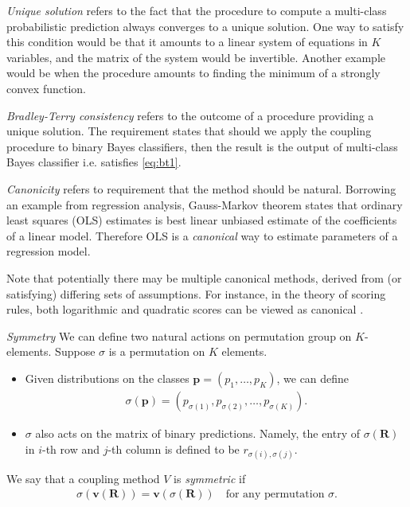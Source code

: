 \emph{Unique solution} refers to the fact that the procedure to compute a multi-class probabilistic prediction always converges to a unique solution. One way to satisfy this condition would be that it amounts to a linear system of equations in $K$ variables, and the matrix of the system would be invertible. Another example would be when the procedure amounts to finding the minimum of a strongly convex function. 

\emph{Bradley-Terry consistency} refers to the outcome of a procedure providing a unique solution. The requirement states that should we apply the coupling procedure to binary Bayes classifiers, then the result is the output of multi-class Bayes classifier i.e. satisfies \eqref{eq:bt1}.

\emph{Canonicity} refers to requirement that the method should be natural. Borrowing an example from regression analysis, Gauss-Markov theorem states that ordinary least squares (OLS) estimates is best linear unbiased estimate of the coefficients of a linear model. Therefore OLS  is a \emph{canonical} way to estimate parameters of a regression model. 

Note that potentially there may be multiple canonical methods, derived from (or satisfying) differing sets of assumptions. For instance, in the theory of scoring rules, both logarithmic and quadratic scores can be viewed as canonical \cite{shannon1948mathematical,selten1998axiomatic}.

\emph{Symmetry} We can define two natural actions on permutation group on $K$-elements. Suppose $\sigma$ is a permutation on $K$ elements. 

\begin{itemize}
	\item Given  distributions on the classes $\boldsymbol{p}= (p_1, \ldots, p_K)$, we can define
	\begin{align}
		\sigma(\boldsymbol{p})= (p_{\sigma(1)},p_{\sigma(2)}, \ldots, p_{\sigma(K)}).
	\end{align}
	 \item $\sigma$ also acts on the matrix of binary predictions. Namely, the entry of $\sigma(\boldsymbol{R})$ in $i$-th row and $j$-th column is defined to be $r_{\sigma(i), \sigma(j)}$.
	 \end{itemize}
We say that a coupling method $V$ is \emph{symmetric} if 
\begin{align}
		\sigma(\boldsymbol{v}(\boldsymbol{R})) = \boldsymbol{v}(\sigma(\boldsymbol{R}))\quad\textrm{for any permutation $\sigma$}.
\end{align}

